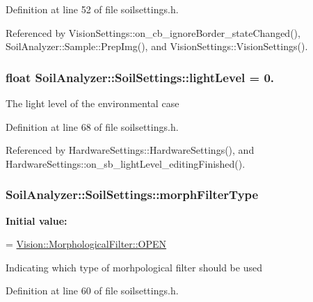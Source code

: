 Definition at line 52 of file soilsettings.\+h.



Referenced by Vision\+Settings\+::on\+\_\+cb\+\_\+ignore\+Border\+\_\+state\+Changed(), Soil\+Analyzer\+::\+Sample\+::\+Prep\+Img(), and Vision\+Settings\+::\+Vision\+Settings().

\hypertarget{class_soil_analyzer_1_1_soil_settings_aa4d3ed8c1ab6551bfa4763e8a1ffc148}{}
\subsubsection[{light\+Level}]{\setlength{\rightskip}{0pt plus 5cm}float Soil\+Analyzer\+::\+Soil\+Settings\+::light\+Level = 0.}\label{class_soil_analyzer_1_1_soil_settings_aa4d3ed8c1ab6551bfa4763e8a1ffc148}
The light level of the environmental case 

Definition at line 68 of file soilsettings.\+h.



Referenced by Hardware\+Settings\+::\+Hardware\+Settings(), and Hardware\+Settings\+::on\+\_\+sb\+\_\+light\+Level\+\_\+editing\+Finished().

\hypertarget{class_soil_analyzer_1_1_soil_settings_ad1420c4800badb3eb07eba4767e3df81}{}
\subsubsection[{morph\+Filter\+Type}]{ Soil\+Analyzer\+::\+Soil\+Settings\+::morph\+Filter\+Type}\label{class_soil_analyzer_1_1_soil_settings_ad1420c4800badb3eb07eba4767e3df81}
{\bfseries Initial value\+:}
\begin{DoxyCode}
=
      \hyperlink{class_vision_1_1_morphological_filter_a1f19c9cb13f0d68778c77d6fd0370868afd436eed00afa15b23eeac4de3509303}{Vision::MorphologicalFilter::OPEN}
\end{DoxyCode}
Indicating which type of morhpological filter should be used 

Definition at line 60 of file soilsettings.\+h.



